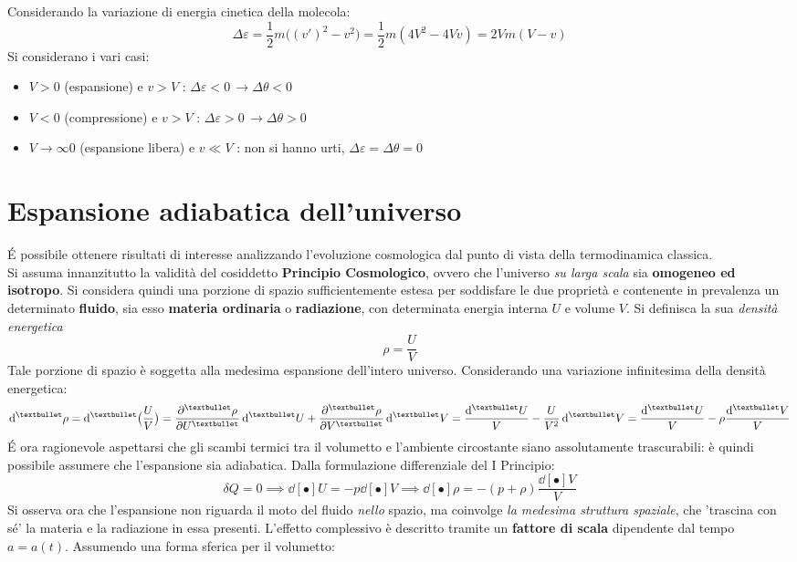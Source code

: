 \documentclass[10pt, oneside]{book}
\begin{document}
{Considerando la variazione di energia cinetica della molecola: 
\[\Delta \varepsilon = \frac{1}{2}m \big((v')^2 - v^2\big) = \frac{1}{2}m(4V^2 - 4Vv) = 2Vm(V-v)\]
Si considerano i vari casi:
\begin{itemize}
\item $V > 0$ (espansione) e $v > V$ : $\Delta \varepsilon < 0 \, \rightarrow \Delta \theta < 0$
\item $V < 0$ (compressione) e $v > V$ : $\Delta \varepsilon > 0 \, \rightarrow \Delta \theta > 0$
\item $V \rightarrow \infty 0$ (espansione libera) e $v \ll V$ : non si hanno urti, $\Delta \varepsilon = \Delta \theta = 0$ 
\end{itemize}
}

\section{Espansione adiabatica dell'universo}
\'E possibile ottenere risultati di interesse analizzando l'evoluzione cosmologica dal punto di vista della termodinamica classica.\\
Si assuma innanzitutto la validità del cosiddetto \textbf{Principio Cosmologico}, ovvero che l'universo \textit{su larga scala} sia \textbf{omogeneo ed isotropo}. Si considera quindi una porzione di spazio sufficientemente estesa per soddisfare le due proprietà e contenente in prevalenza un determinato \textbf{fluido}, sia esso \textbf{materia ordinaria} o \textbf{radiazione}, con determinata energia interna $U$ e volume $V$. Si definisca la sua \textit{densità energetica} 
\[\rho = \frac{U}{V}\]
Tale porzione di spazio è soggetta alla medesima espansione dell'intero universo. Considerando una variazione infinitesima della densità energetica:
\[\dd[•]{\rho} = \dd[•]{\big(\frac{U}{V}\big)} = \pdv[•]{\rho}{U} \dd[•]{U} + \pdv[•]{\rho}{V}\dd[•]{V} = \frac{\dd[•]{U}}{V} - \frac{U}{V^2}\dd[•]{V} = \frac{\dd[•]{U}}{V} - \rho \frac{\dd[•]{V}}{V}\]
\'E ora ragionevole aspettarsi che gli scambi termici tra il volumetto e l'ambiente circostante siano assolutamente trascurabili: è quindi possibile assumere che l'espansione sia adiabatica. Dalla formulazione differenziale del I Principio:
\[\delta Q = 0 \implies \dd[•]{U} = - p \dd[•]{V} \implies \dd[•]{\rho} = - (p + \rho)\frac{\dd[•]{V}}{V}\]
Si osserva ora che l'espansione non riguarda il moto del fluido \textit{nello} spazio, ma coinvolge \textit{la medesima struttura spaziale}, che 'trascina con sé' la materia e la radiazione in essa presenti. L'effetto complessivo è descritto tramite un \textbf{fattore di scala} dipendente dal tempo $a = a(t)$. Assumendo una forma sferica per il volumetto:
\end{document}
